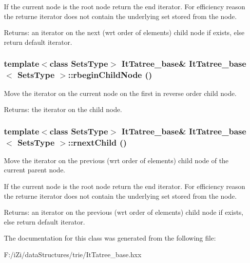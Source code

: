 If the current node is the root node return the end iterator. For efficiency reason the returne iterator does not contain the underlying set stored from the node. \begin{Desc}
\item[Returns:]an iterator on the next (wrt order of elements) child node if exists, else return default iterator. \end{Desc}
\subsubsection{\setlength{\rightskip}{0pt plus 5cm}template$<$class Sets\-Type$>$ {\bf It\-Tatree\_\-base}\& {\bf It\-Tatree\_\-base}$<$ Sets\-Type $>$::rbegin\-Child\-Node ()\hspace{0.3cm}{\tt  [inline]}}\label{class_it_tatree__base_fb3bdc6147396c842dcedc385dc93f73}


Move the iterator on the current node on the first in reverse order child node. 

\begin{Desc}
\item[Returns:]the iterator on the child node. \end{Desc}
\subsubsection{\setlength{\rightskip}{0pt plus 5cm}template$<$class Sets\-Type$>$ {\bf It\-Tatree\_\-base}\& {\bf It\-Tatree\_\-base}$<$ Sets\-Type $>$::rnext\-Child ()\hspace{0.3cm}{\tt  [inline]}}\label{class_it_tatree__base_f0ac7e5e53428400220df060dbcdd66a}


Move the iterator on the previous (wrt order of elements) child node of the current parent node. 

If the current node is the root node return the end iterator. For efficiency reason the returne iterator does not contain the underlying set stored from the node. \begin{Desc}
\item[Returns:]an iterator on the previous (wrt order of elements) child node if exists, else return default iterator. \end{Desc}


The documentation for this class was generated from the following file:\begin{CompactItemize}
\item 
F:/i\-Zi/data\-Structures/trie/It\-Tatree\_\-base.hxx\end{CompactItemize}

